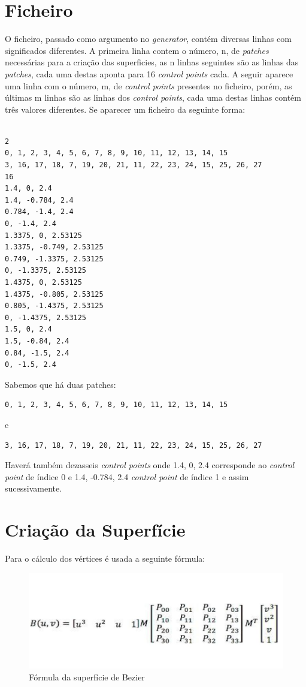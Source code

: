 \section{Ficheiro}
O ficheiro, passado como argumento no \textit{generator}, contém diversas linhas com significados diferentes. A primeira linha contem o número, n, de \textit{patches} necessárias para a criação das superficies, as n linhas seguintes são as linhas das \textit{patches}, cada uma destas aponta para 16 \textit{control points} cada. A seguir aparece uma linha com o número, m, de \textit{control points} presentes no ficheiro, porém, as últimas m linhas são as linhas dos \textit{control points}, cada uma destas linhas contém três valores diferentes.
Se aparecer um ficheiro da seguinte forma: 

\begin{verbatim}

2
0, 1, 2, 3, 4, 5, 6, 7, 8, 9, 10, 11, 12, 13, 14, 15
3, 16, 17, 18, 7, 19, 20, 21, 11, 22, 23, 24, 15, 25, 26, 27
16
1.4, 0, 2.4
1.4, -0.784, 2.4
0.784, -1.4, 2.4
0, -1.4, 2.4
1.3375, 0, 2.53125
1.3375, -0.749, 2.53125
0.749, -1.3375, 2.53125
0, -1.3375, 2.53125
1.4375, 0, 2.53125
1.4375, -0.805, 2.53125
0.805, -1.4375, 2.53125
0, -1.4375, 2.53125
1.5, 0, 2.4
1.5, -0.84, 2.4
0.84, -1.5, 2.4
0, -1.5, 2.4
\end{verbatim}

Sabemos que há duas patches: 

\begin{verbatim}
0, 1, 2, 3, 4, 5, 6, 7, 8, 9, 10, 11, 12, 13, 14, 15
\end{verbatim}

e \begin{verbatim}
3, 16, 17, 18, 7, 19, 20, 21, 11, 22, 23, 24, 15, 25, 26, 27
\end{verbatim}

Haverá também dezasseis \textit{control points} onde 1.4, 0, 2.4 corresponde ao \textit{control point} de índice 0 e  1.4, -0.784, 2.4 \textit{control point} de índice 1 e assim sucessivamente.


\section{Criação da Superfície}


Para o cálculo dos vértices é usada a seguinte fórmula:
\begin{figure}[htpb]
	\centering
	\includegraphics[scale=0.6]{imagens/bezier.png}
	\caption{Fórmula da superfície de Bezier}
	\label{p1:fig:p1_bezier}
\end{figure}

